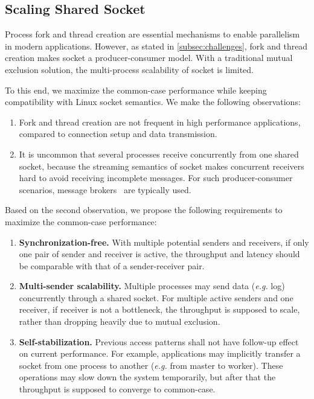 \subsection{Scaling Shared Socket}
\label{subsec:fork}

Process fork and thread creation are essential mechanisms to enable parallelism in modern applications. 
However, as stated in \ref{subsec:challenges}, fork and thread creation makes socket a producer-consumer model. With a traditional mutual exclusion solution, the multi-process scalability of socket is limited.

To this end, we maximize the common-case performance while keeping compatibility with Linux socket semantics.
We make the following observations:
\begin{enumerate}
	\item Fork and thread creation are not frequent in high performance applications, compared to connection setup and data transmission.
	\item It is uncommon that several processes receive concurrently from one shared socket, because the streaming semantics of socket makes concurrent receivers hard to avoid receiving incomplete messages. For such producer-consumer scenarios, message brokers~\cite{hintjens2013zeromq,rabbitmq2017rabbitmq,kreps2011kafka} are typically used.
\end{enumerate}

Based on the second observation, we propose the following requirements to maximize the common-case performance:
\begin{enumerate}
 \item \textbf{Synchronization-free.} With multiple potential senders and receivers, if only one pair of sender and receiver is active, the throughput and latency should be comparable with that of a sender-receiver pair.
 \item \textbf{Multi-sender scalability.} Multiple processes may send data (\textit{e.g.} log) concurrently through a shared socket. For multiple active senders and one receiver, if receiver is not a bottleneck, the throughput is supposed to scale, rather than dropping heavily due to mutual exclusion.
 \item \textbf{Self-stabilization.} Previous access patterns shall not have follow-up effect on current performance. For example, applications may implicitly transfer a socket from one process to another (\textit{e.g.} from master to worker). These operations may slow down the system temporarily, but after that the throughput is supposed to converge to common-case.
\end{enumerate}


